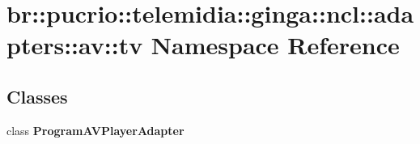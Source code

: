 \section{br::pucrio::telemidia::ginga::ncl::adapters::av::tv Namespace Reference}
\label{namespacebr_1_1pucrio_1_1telemidia_1_1ginga_1_1ncl_1_1adapters_1_1av_1_1tv}


\subsection*{Classes}
\begin{CompactItemize}
\item 
class {\bf ProgramAVPlayerAdapter}
\end{CompactItemize}
